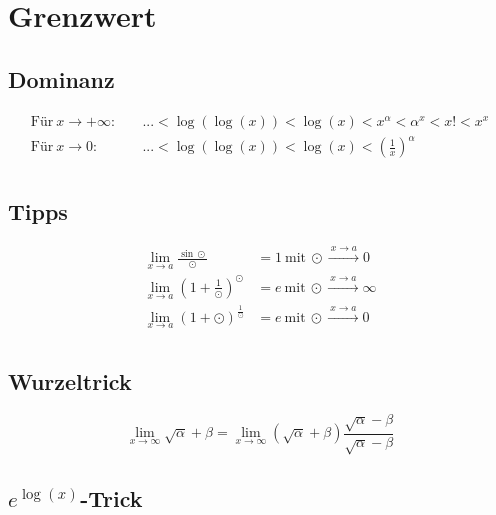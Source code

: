 \documentclass[11pt]{article}
\begin{document}
\section{Grenzwert}

\subsection{Dominanz}

\begin{equation*}
\begin{split}
	\text{Für}\ x \to +\infty:\quad & ... < \log(\log(x)) < \log(x) < x^\alpha < \alpha^x < x! < x^x \\
	\text{Für}\ x \to 0:\quad & ... < \log(\log(x)) < \log(x) < (\frac{1}{x})^\alpha \\
\end{split}
\end{equation*}

\subsection{Tipps}

\begin{equation*}
\begin{split}
	\lim_{x \to a} \frac{\sin \odot}{\odot} & = 1\ \text{mit}\ \odot \xrightarrow{\: x \to a \: } 0 \\ 
	\lim_{x \to a} (1 + \frac{1}{\odot})^\odot & = e\ \text{mit}\ \odot \xrightarrow{\: x \to a \: } \infty \\ 
	\lim_{x \to a} (1 + \odot)^\frac{1}{\odot} & = e\ \text{mit}\ \odot \xrightarrow{\: x \to a \: } 0 \\ 
\end{split}
\end{equation*}

\subsection{Wurzeltrick}

\begin{equation*}
	\lim_{x\to\infty} \sqrt{\alpha}+\beta = \lim_{x\to\infty}(\sqrt{\alpha}+\beta)\frac{\sqrt{\alpha}-\beta}{\sqrt{\alpha}-\beta}
\end{equation*}

\subsection{$e^{\log(x)}$-Trick}
\end{document}
